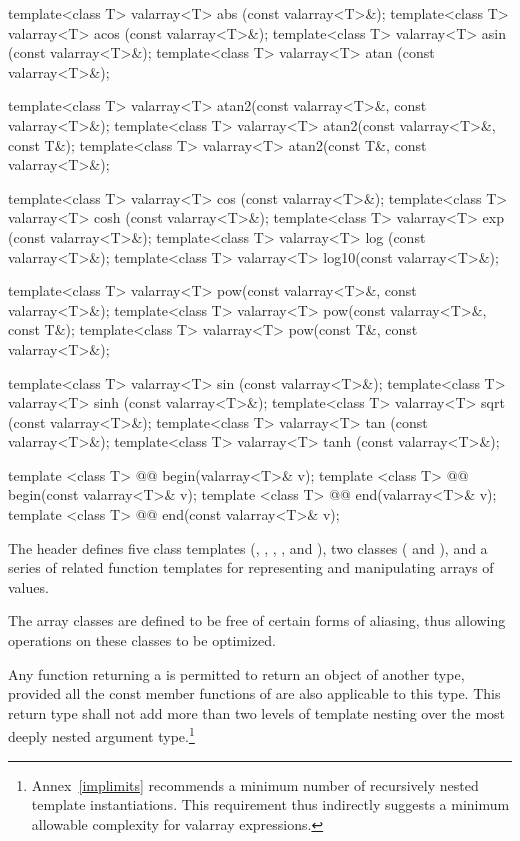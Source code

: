 \begin{codeblock}
{  template<class T> valarray<T> abs  (const valarray<T>&);
  template<class T> valarray<T> acos (const valarray<T>&);
  template<class T> valarray<T> asin (const valarray<T>&);
  template<class T> valarray<T> atan (const valarray<T>&);

  template<class T> valarray<T> atan2(const valarray<T>&, const valarray<T>&);
  template<class T> valarray<T> atan2(const valarray<T>&, const T&);
  template<class T> valarray<T> atan2(const T&, const valarray<T>&);

  template<class T> valarray<T> cos  (const valarray<T>&);
  template<class T> valarray<T> cosh (const valarray<T>&);
  template<class T> valarray<T> exp  (const valarray<T>&);
  template<class T> valarray<T> log  (const valarray<T>&);
  template<class T> valarray<T> log10(const valarray<T>&);

  template<class T> valarray<T> pow(const valarray<T>&, const valarray<T>&);
  template<class T> valarray<T> pow(const valarray<T>&, const T&);
  template<class T> valarray<T> pow(const T&, const valarray<T>&);

  template<class T> valarray<T> sin  (const valarray<T>&);
  template<class T> valarray<T> sinh (const valarray<T>&);
  template<class T> valarray<T> sqrt (const valarray<T>&);
  template<class T> valarray<T> tan  (const valarray<T>&);
  template<class T> valarray<T> tanh (const valarray<T>&);

  template <class T> @@ begin(valarray<T>& v);
  template <class T> @@ begin(const valarray<T>& v);
  template <class T> @@ end(valarray<T>& v);
  template <class T> @@ end(const valarray<T>& v);
}
\end{codeblock}

\pnum
The header
defines five
class templates
(,
,
,
,
and
),
two classes (
and
),
and a series of related
function templates
for representing
and manipulating arrays of values.

\pnum
The
array classes
are defined to be free of certain forms of aliasing, thus allowing
operations on these classes to be optimized.

\pnum
Any function returning a
is permitted to return an object of another type, provided all the
const member functions of
are also applicable to this type.
This return type shall not add
more than two levels of template nesting over the most deeply nested
argument type.\footnote{Annex~\ref{implimits} recommends a minimum number
of recursively nested template
instantiations.
This requirement thus indirectly suggests a minimum
allowable complexity for valarray expressions.}

